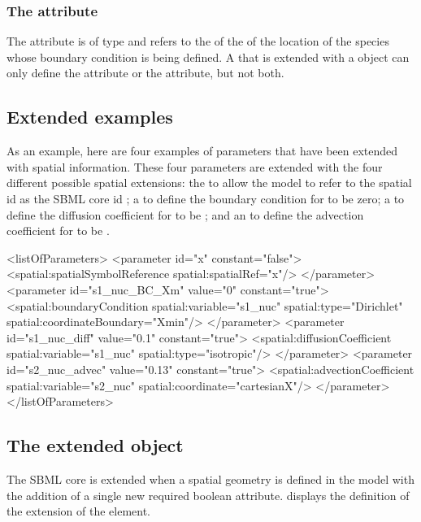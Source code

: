 \subsubsection{The \fixttspace{} attribute}
The  attribute is of type  and refers to the  of the \DomainType of the location of the species whose boundary condition is being defined. A \Parameter that is extended with a \BoundaryCondition object can only define the  attribute or the  attribute, but not both. 


\subsection{Extended \Parameter examples}

As an example, here are four examples of parameters that have been extended with spatial information.  These four parameters are extended with the four different possible spatial extensions: the \SpatialSymbolReference to allow the model to refer to the spatial id  as the SBML core id ; a \BoundaryCondition to define the boundary condition for  to be zero; a \DiffusionCoefficient to define the diffusion coefficient for  to be ; and an \AdvectionCoefficient to define the advection coefficient for  to be .

\begin{example}
  <listOfParameters>
    <parameter id="x" constant="false">
      <spatial:spatialSymbolReference spatial:spatialRef="x"/>
    </parameter>
    <parameter id="s1_nuc_BC_Xm" value="0" constant="true">
      <spatial:boundaryCondition spatial:variable="s1_nuc" spatial:type="Dirichlet"
                                 spatial:coordinateBoundary="Xmin"/>
    </parameter>
    <parameter id="s1_nuc_diff" value="0.1" constant="true">
      <spatial:diffusionCoefficient spatial:variable="s1_nuc" spatial:type="isotropic"/>
    </parameter>
    <parameter id="s2_nuc_advec" value="0.13" constant="true">
      <spatial:advectionCoefficient spatial:variable="s2_nuc" spatial:coordinate="cartesianX"/>
    </parameter>
  </listOfParameters>
\end{example}

\subsection{The extended \Reaction object}
\label{extended-reaction-class}
The SBML core \Reaction is extended when a spatial geometry is defined in the model with the addition of a single new required boolean  attribute.  displays the definition of the extension of the \Reaction element.
 
